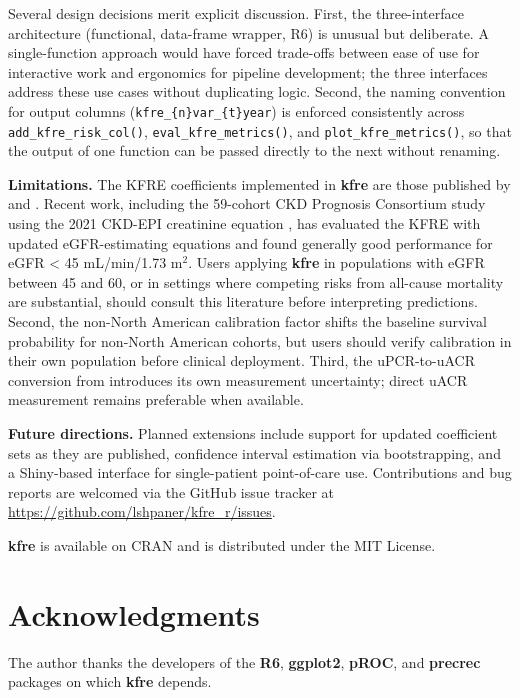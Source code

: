 Several design decisions merit explicit discussion. First, the three-interface
architecture (functional, data-frame wrapper, R6) is unusual but deliberate. A
single-function approach would have forced trade-offs between ease of use for
interactive work and ergonomics for pipeline development; the three interfaces
address these use cases without duplicating logic. Second, the naming convention
for output columns (\texttt{kfre\_\{n\}var\_\{t\}year}) is enforced consistently across
\texttt{add\_kfre\_risk\_col()}, \texttt{eval\_kfre\_metrics()}, and \texttt{plot\_kfre\_metrics()}, so
that the output of one function can be passed directly to the next without
renaming.

\textbf{Limitations.} The KFRE coefficients implemented in \textbf{kfre} are those
published by \citet{tangri2011} and \citet{tangri2016}. Recent work, including the 59-cohort
CKD Prognosis Consortium study using the 2021 CKD-EPI creatinine equation
\citep{grams2023}, has evaluated the KFRE with updated eGFR-estimating equations and
found generally good performance for eGFR \textless{} 45 mL/min/1.73 m\(^2\). Users
applying \textbf{kfre} in populations with eGFR between 45 and 60, or in settings
where competing risks from all-cause mortality are substantial, should consult
this literature before interpreting predictions. Second, the non-North American
calibration factor shifts the baseline survival probability for non-North
American cohorts, but users should verify calibration in their own population
before clinical deployment. Third, the uPCR-to-uACR conversion from \citet{sumida2020}
introduces its own measurement uncertainty; direct uACR measurement remains
preferable when available.

\textbf{Future directions.} Planned extensions include support for updated coefficient
sets as they are published, confidence interval estimation via bootstrapping, and
a Shiny-based interface for single-patient point-of-care use. Contributions and
bug reports are welcomed via the GitHub issue tracker at
\url{https://github.com/lshpaner/kfre_r/issues}.

\textbf{kfre} is available on CRAN and is distributed under the MIT License.

\section*{Acknowledgments}\label{acknowledgments}

The author thanks the developers of the \textbf{R6}, \textbf{ggplot2}, \textbf{pROC},
and \textbf{precrec} packages on which \textbf{kfre} depends.



\address{%
Leonid Shpaner\\
UCLA\\%
Los Angeles, CA\\
%
%
%
\href{mailto:lshpaner@ucla.edu}{\nolinkurl{lshpaner@ucla.edu}}%
}
